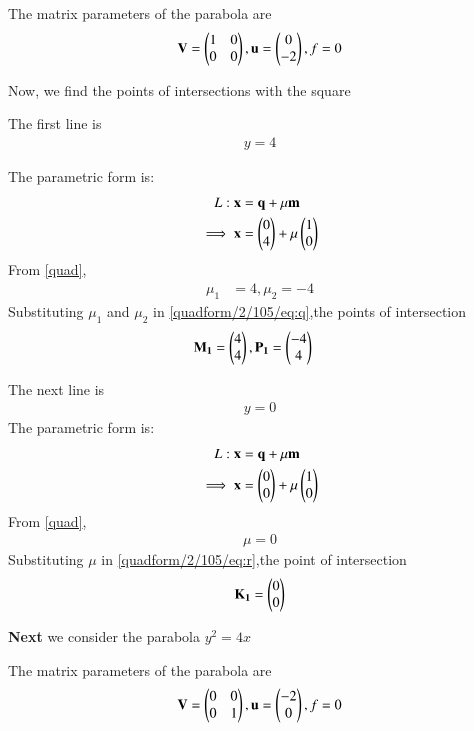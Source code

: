 \documentclass[journal,12pt,twocolumn]{IEEEtran}
\begin{document}
The matrix parameters of the parabola are
\begin{align}
\mathbf{V}=\begin{pmatrix}1&0\\0&0\end{pmatrix},\mathbf{u}=\begin{pmatrix}0\\-2\end{pmatrix},f=0 \label{quadform/2/105/eq:v}
\end{align}

Now, we find the points of intersections with the square

The first line is
\begin{align} 
y=4
\end{align}

 The parametric form is:
\begin{align} 
L: \mathbf{x}&=\mathbf{q}+\mu\mathbf{m}
\\
\implies \mathbf{x}&=\begin{pmatrix}0\\4\end{pmatrix}+\mu\begin{pmatrix}1\\0\end{pmatrix} \label{quadform/2/105/eq:q}
\end{align}
From  \eqref{quad},
\begin{align}
\mu_1 &= 4, \mu_2 =-4
\end{align}
Substituting $\mu_1$ and $\mu_2$ in \eqref{quadform/2/105/eq:q},the points of intersection
\begin{align}
 \mathbf{M_1}= \begin{pmatrix}4\\4\end{pmatrix},  
\mathbf{P_1}&= \begin{pmatrix}-4\\4\end{pmatrix}
\end{align}

The next line is 
\begin{align} 
y=0
\end{align}
The parametric form is:
\begin{align} 
L: \mathbf{x}&=\mathbf{q}+\mu\mathbf{m}
\\
\implies \mathbf{x}&=\begin{pmatrix}0\\0\end{pmatrix}+\mu\begin{pmatrix}1\\0\end{pmatrix} \label{quadform/2/105/eq:r}
\end{align}
From  \eqref{quad},
\begin{align}
\mu = 0
\end{align}
Substituting $\mu$ in \eqref{quadform/2/105/eq:r},the point of intersection
\begin{align}
 \mathbf{K_1}= \begin{pmatrix}0\\0\end{pmatrix}
\end{align}

\textbf{Next} we consider the parabola $y^2 = 4x$

The matrix parameters of the parabola are
\begin{align}
\mathbf{V}=\begin{pmatrix}0&0\\0&1\end{pmatrix},\mathbf{u}=\begin{pmatrix}-2\\0\end{pmatrix},f=0 \label{quadform/2/105/eq:vi}
\end{align}
\end{document}
